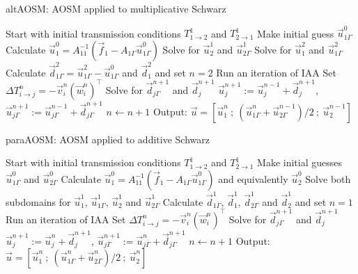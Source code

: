 \documentclass{beamer}
\begin{document}
\begin{frame}
\begin{algorithm}[H]
	\caption{altAOSM: AOSM applied to multiplicative Schwarz} %
	\label{alg: alt}
	\begin{algorithmic}[1]
		\State Start with initial transmission conditions $T_{1 \to 2}^1$ and $T_{2 \to 1}^1$
		\State Make initial guess $\vec{u}_{1 \Gamma}^0$
		\State Calculate $\vec{u}_1^0 = A_{11}^{-1} ( \vec{f}_1 - A_{1 \Gamma} \vec{u}_{1 \Gamma}^0 )$
		\State Solve for $\vec{u}_2^1$ and $\vec{u}_{2 \Gamma}^1$
		\State Solve for $\vec{u}_1^2$ and $\vec{u}_{1 \Gamma}^2$
		\State Calculate $\vec{d}_{1 \Gamma}^2 = \vec{u}_{1 \Gamma}^2 - \vec{u}_{1 \Gamma}^0$ and $\vec{d}_1^2$ and set $n=2$
				\State Run an iteration of IAA
				\State Set $\Delta T_{i \to j}^n = - \vec{v}_i^n (\vec{w}_i^n)^\top$
				\State Solve for $\vec{d}_{j \Gamma}^{n+1}$ and $\vec{d}_j^{n+1}$
				\State $\vec{u}_j^{n+1} := \vec{u}_j^{n-1} + \vec{d}_j^{n+1}$, $\vec{u}_{j \Gamma}^{n+1} := \vec{u}_{j \Gamma}^{n-1} + \vec{d}_{j \Gamma}^{n+1}$
				\State $n \gets n+1$
			\EndFor
		\EndWhile
		\State Output: $\vec{u} = [ \vec{u}_1^n \ ; \ (\vec{u}_{1 \Gamma}^n + \vec{u}_{2 \Gamma}^{n-1})/2 \ ; \ \vec{u}_2^{n-1} ]$
	\end{algorithmic}
\end{algorithm}
\end{frame}

\begin{frame}
\begin{algorithm}[H]
	\caption{paraAOSM: AOSM applied to additive Schwarz} %
	\label{alg: para}
	\begin{algorithmic}[1]
		\State Start with initial transmission conditions $T_{1 \to 2}^1$ and $T_{2 \to 1}^1$
		\State Make initial guesses $\vec{u}_{1 \Gamma}^0$ and $\vec{u}_{2 \Gamma}^0$
		\State Calculate $\vec{u}_1^0 = A_{11}^{-1} ( \vec{f}_1 - A_{1 \Gamma} \vec{u}_{1 \Gamma}^0 )$ and equivalently $\vec{u}_2^0$
		\State Solve both subdomains for $\vec{u}_1^1$, $\vec{u}_{1 \Gamma}^1$, $\vec{u}_2^1$ and $\vec{u}_{2 \Gamma}^1$
		\State Calculate $\vec{d}_{1 \Gamma}^1$, $\vec{d}_1^1$, $\vec{d}_{2 \Gamma}^1$ and $\vec{d}_2^1$ and set $n=1$
				\State Run an iteration of IAA
				\State Set $\Delta T_{i \to j}^n = - \vec{v}_i^n (\vec{w}_i^n)^\top$
				\State Solve for $\vec{d}_{j \Gamma}^{n+1}$ and $\vec{d}_j^{n+1}$
				\State $\vec{u}_j^{n+1} := \vec{u}_j^{n} + \vec{d}_j^{n+1}$, $\vec{u}_{j \Gamma}^{n+1} := \vec{u}_{j \Gamma}^{n} + \vec{d}_{j \Gamma}^{n+1}$
			\EndFor
			\State $n \gets n+1$
		\EndWhile
		\State Output: $\vec{u} = [ \vec{u}_1^n \ ; \ (\vec{u}_{1 \Gamma}^n + \vec{u}_{2 \Gamma}^n)/2 \ ; \ \vec{u}_2^n ]$
	\end{algorithmic}
\end{algorithm}
\end{frame}
\end{document}
